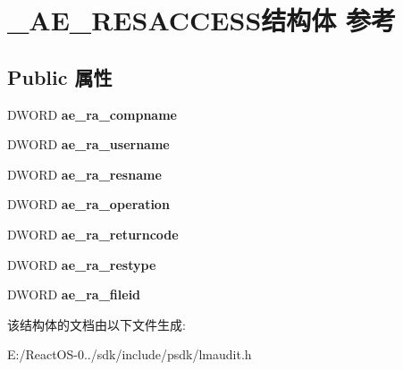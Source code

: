 \hypertarget{struct___a_e___r_e_s_a_c_c_e_s_s}{}\section{\+\_\+\+A\+E\+\_\+\+R\+E\+S\+A\+C\+C\+E\+S\+S结构体 参考}
\label{struct___a_e___r_e_s_a_c_c_e_s_s}
\subsection*{Public 属性}
\begin{DoxyCompactItemize}
\item 
\mbox{\label{struct___a_e___r_e_s_a_c_c_e_s_s_a28fc494f75fa0e7be8423a84537fa3cd}} 
D\+W\+O\+RD {\bfseries ae\+\_\+ra\+\_\+compname}
\item 
\mbox{\label{struct___a_e___r_e_s_a_c_c_e_s_s_ad2ee39f21e2806dbe8b0576e1701e2e6}} 
D\+W\+O\+RD {\bfseries ae\+\_\+ra\+\_\+username}
\item 
\mbox{\label{struct___a_e___r_e_s_a_c_c_e_s_s_a5fa35d27d33144eccb601ecde7f8d7c2}} 
D\+W\+O\+RD {\bfseries ae\+\_\+ra\+\_\+resname}
\item 
\mbox{\label{struct___a_e___r_e_s_a_c_c_e_s_s_aaee417338cfcc8810adb845ba8974aff}} 
D\+W\+O\+RD {\bfseries ae\+\_\+ra\+\_\+operation}
\item 
\mbox{\label{struct___a_e___r_e_s_a_c_c_e_s_s_ad4efee2177a0c641d13d3cac5fe83e28}} 
D\+W\+O\+RD {\bfseries ae\+\_\+ra\+\_\+returncode}
\item 
\mbox{\label{struct___a_e___r_e_s_a_c_c_e_s_s_a1b1c2df2ef1d4187510e5a506c2e4661}} 
D\+W\+O\+RD {\bfseries ae\+\_\+ra\+\_\+restype}
\item 
\mbox{\label{struct___a_e___r_e_s_a_c_c_e_s_s_a31984e4685b3fee0d401ac5a0a578a67}} 
D\+W\+O\+RD {\bfseries ae\+\_\+ra\+\_\+fileid}
\end{DoxyCompactItemize}


该结构体的文档由以下文件生成\+:\begin{DoxyCompactItemize}
\item 
E\+:/\+React\+O\+S-\/0../sdk/include/psdk/lmaudit.\+h\end{DoxyCompactItemize}
